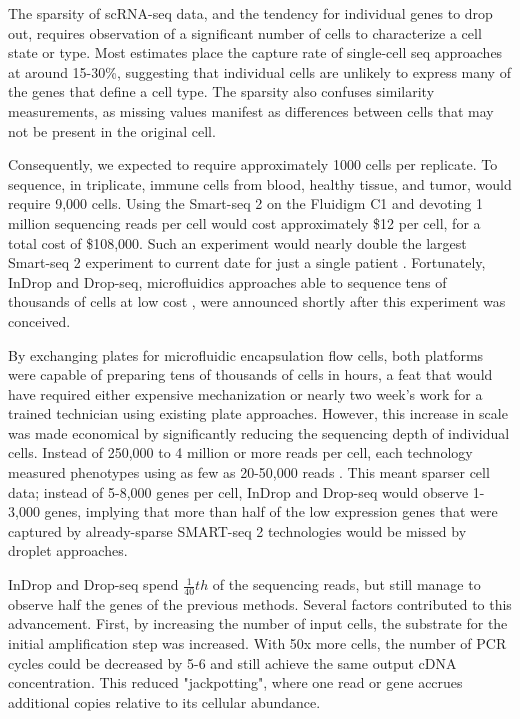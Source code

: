 The sparsity of scRNA-seq data, and the tendency for individual genes to drop out, requires observation of a significant number of cells to characterize a cell state or type. 
Most estimates place the capture rate of single-cell seq approaches at around 15-30\%, suggesting that individual cells are unlikely to express many of the genes that define a cell type. 
The sparsity also confuses similarity measurements, as missing values manifest as differences between cells that may not be present in the original cell. 

Consequently, we expected to require approximately 1000 cells per replicate. 
To sequence, in triplicate, immune cells from blood, healthy tissue, and tumor, would require 9,000 cells. 
Using the Smart-seq 2 on the Fluidigm C1 and devoting 1 million sequencing reads per cell would cost approximately \$12 per cell, for a total cost of \$108,000.
Such an experiment would nearly double the largest Smart-seq 2 experiment to current date for just a single patient \citep{Zheng2017}. 
Fortunately, InDrop and Drop-seq, microfluidics approaches able to sequence tens of thousands of cells at low cost \citep{Klein2015,Macosko2015}, were announced shortly after this experiment was conceived. 

By exchanging plates for microfluidic encapsulation flow cells, both platforms were capable of preparing tens of thousands of cells in hours, a feat that would have required either expensive mechanization or nearly two week’s work for a trained technician using existing plate approaches. 
However, this increase in scale was made economical by significantly reducing the sequencing depth of individual cells.
Instead of 250,000 to 4 million or more reads per cell, each technology measured phenotypes using as few as 20-50,000 reads \citep{Klein2015,Macosko2015}.
This meant sparser cell data; instead of 5-8,000 genes per cell, InDrop and Drop-seq would observe 1-3,000 genes, implying that more than half of the low expression genes that were captured by already-sparse SMART-seq 2 technologies would be missed by droplet approaches.  

InDrop and Drop-seq spend $\frac{1}{40}th$ of the sequencing reads, but still manage to observe half the genes of the previous methods. 
Several factors contributed to this advancement. 
First, by increasing the number of input cells, the substrate for the initial amplification step was increased. With 50x more cells, the number of PCR cycles could be decreased by 5-6 and still achieve the same output cDNA concentration.
This reduced "jackpotting", where one read or gene accrues additional copies relative to its cellular abundance. 

